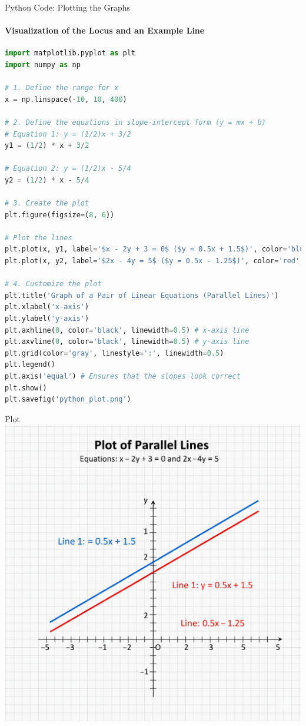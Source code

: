 \documentclass{beamer}
\begin{document}
\begin{frame}[fragile]{Python Code: Plotting the Graphs}
    \framesubtitle{Visualization of the Locus and an Example Line}
    
    \lstset{style=PythonStyle}
    \begin{lstlisting}[language=Python]
import matplotlib.pyplot as plt
import numpy as np

# 1. Define the range for x
x = np.linspace(-10, 10, 400)

# 2. Define the equations in slope-intercept form (y = mx + b)
# Equation 1: y = (1/2)x + 3/2
y1 = (1/2) * x + 3/2

# Equation 2: y = (1/2)x - 5/4
y2 = (1/2) * x - 5/4

# 3. Create the plot
plt.figure(figsize=(8, 6))

# Plot the lines
plt.plot(x, y1, label='$x - 2y + 3 = 0$ ($y = 0.5x + 1.5$)', color='blue')
plt.plot(x, y2, label='$2x - 4y = 5$ ($y = 0.5x - 1.25$)', color='red', linestyle='--')

# 4. Customize the plot
plt.title('Graph of a Pair of Linear Equations (Parallel Lines)')
plt.xlabel('x-axis')
plt.ylabel('y-axis')
plt.axhline(0, color='black', linewidth=0.5) # x-axis line
plt.axvline(0, color='black', linewidth=0.5) # y-axis line
plt.grid(color='gray', linestyle=':', linewidth=0.5)
plt.legend()
plt.axis('equal') # Ensures that the slopes look correct
plt.show()
plt.savefig('python_plot.png')
    \end{lstlisting}
\end{frame}

\begin{frame}{Plot}
    \centering
    \includegraphics[width=\columnwidth, height=0.8\textheight, keepaspectratio]{figs/python_plot.png}     
\end{frame}
\end{document}
